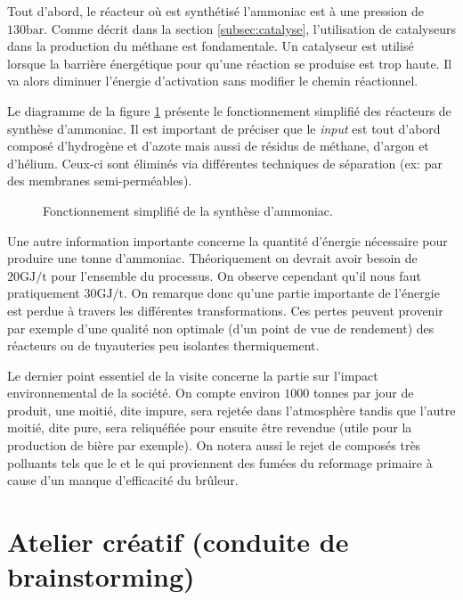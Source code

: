 \documentclass[a4paper, oneside, 12pt]{article}
\begin{document}
Tout d'abord, le réacteur où est synthétisé l'ammoniac est à une pression de $130 \si{\bar}$. Comme décrit dans la section \ref{subsec:catalyse}, l'utilisation de catalyseurs dans la production du méthane est fondamentale. Un catalyseur est utilisé lorsque la barrière énergétique pour qu'une réaction se produise est trop haute. Il va alors diminuer l'énergie d'activation sans modifier le chemin réactionnel.

Le diagramme de la figure \ref{fig:synthese} présente le fonctionnement simplifié des réacteurs de synthèse d'ammoniac. Il est important de préciser que le \emph{input} est tout d'abord composé d'hydrogène et d'azote mais aussi de résidus de méthane, d'argon et d'hélium. Ceux-ci sont éliminés via différentes techniques de séparation (ex: par 
des membranes semi-perméables). 

\begin{figure}[h!]
	\begin{center}
		
	\end{center}
	\caption{Fonctionnement simplifié de la synthèse d'ammoniac.}
	\label{fig:synthese}
\end{figure}

Une autre information importante concerne la quantité d'énergie nécessaire pour produire
une tonne d'ammoniac. Théoriquement on devrait avoir besoin de $20 \si{\giga\joule/\tonne}$
pour l'ensemble du processus. On observe cependant qu'il nous faut 
pratiquement $30 \si{\giga\joule/\tonne}$. On remarque donc qu'une partie 
importante de l'énergie est perdue à travers les différentes transformations. 
Ces pertes peuvent provenir par exemple d'une qualité non optimale (d'un point de vue 
de rendement) des réacteurs ou de tuyauteries peu isolantes thermiquement.

Le dernier point essentiel de la visite concerne la partie sur l'impact environnemental 
de la société. On compte environ $1000$ tonnes par jour de  produit, une moitié,
dite impure, sera rejetée dans l'atmosphère tandis que l'autre moitié, dite pure, 
sera reliquéfiée pour ensuite être revendue (utile pour la production de bière par exemple).
On notera aussi le rejet de composés très polluants tels que le  et le  
qui proviennent des fumées du reformage primaire à cause d'un manque d'efficacité
du brûleur.

\section{Atelier créatif (conduite de brainstorming)}
\end{document}
